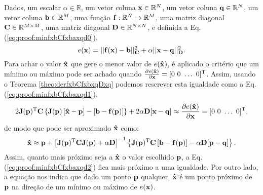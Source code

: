 \begin{myproofT}\label{proof:theo:minfxbCfxbaxqd}
Dados,
um escalar $\alpha\in \mathbb{R}$,
um vetor coluna $\VECTOR{x}\in \mathbb{R}^N$, 
um vetor coluna $\VECTOR{q}\in \mathbb{R}^N$, 
um vetor coluna $\VECTOR{b}\in \mathbb{R}^M$,  
uma função $\VECTOR{f}:\mathbb{R}^{N} \rightarrow \mathbb{R}^{M}$, 
uma matriz diagonal $\MATRIX{C} \in \mathbb{R}^{M\times M}$,
uma matriz diagonal $\MATRIX{D} \in \mathbb{R}^{N\times N}$, e 
definida a Eq. (\ref{eq:proof:minfxbCfxbaxqd0}),
\begin{equation}\label{eq:proof:minfxbCfxbaxqd0}
e(\VECTOR{x})=||\VECTOR{f}(\VECTOR{x})-\VECTOR{b}||_{\MATRIX{C}}^2+\alpha||\VECTOR{x}-\VECTOR{q}||_{\MATRIX{D}}^2.
\end{equation}
Para achar o valor  $\VECTOR{\hat{x}}$ que gere o menor valor de $e(\VECTOR{\hat{x}})$, é aplicado
o critério que um mínimo ou máximo pode ser achado quando 
$\frac{\partial e(\VECTOR{\hat{x}})}{\partial \VECTOR{x} }=[0~ 0~ \hdots~ 0 ]^{\transpose}$.
Assim, usando o Teorema \ref{theo:derfxbCfxbxqDxq} podemos 
rescrever esta igualdade como a Eq. (\ref{eq:proof:minfxbCfxbaxqd1}),
\begin{equation}\label{eq:proof:minfxbCfxbaxqd1}
2 \MATRIX{J}(\VECTOR{p})^{\transpose}\MATRIX{C}\left\{\MATRIX{J}(\VECTOR{p})\left[\VECTOR{\hat{x}} - \VECTOR{p}\right]-\left[\VECTOR{b}-\VECTOR{f}(\VECTOR{p})\right]\right\} 
+2\alpha\MATRIX{D} [\VECTOR{x} -\VECTOR{q}] \approx
\frac{\partial e(\VECTOR{\hat{x}})}{\partial \VECTOR{x} }=[0~ 0~ \hdots~ 0 ]^{\transpose},
\end{equation}
de modo que pode ser aproximado $\VECTOR{\hat{x}}$ como:
\begin{equation}\label{eq:proof:minfxbCfxbaxqd2}
\VECTOR{\hat{x}} \approx \VECTOR{p} +
\left[ \MATRIX{J}(\VECTOR{p})^{\transpose}\MATRIX{C} \MATRIX{J}(\VECTOR{p})+\alpha \MATRIX{D} \right]^{-1}
\left\{ \MATRIX{J}(\VECTOR{p})^{\transpose}\MATRIX{C} \left[\VECTOR{b}-\VECTOR{f}(\VECTOR{p})\right]-\alpha\MATRIX{D}[\VECTOR{p}-\VECTOR{q}]\right\}.
\end{equation}
Assim, quanto mais próximo seja a $\VECTOR{\hat{x}}$ o valor escolhido $\VECTOR{p}$, 
a Eq. (\ref{eq:proof:minfxbCfxbaxqd2}) fica mais próximo a uma igualdade. Por outro lado,
a equação nos indica que dado um ponto  $\VECTOR{p}$ qualquer,
$\VECTOR{\hat{x}}$
é um ponto próximo de $\VECTOR{p}$  na direção de um mínimo ou máximo de $ e(\VECTOR{x})$.

\end{myproofT}
